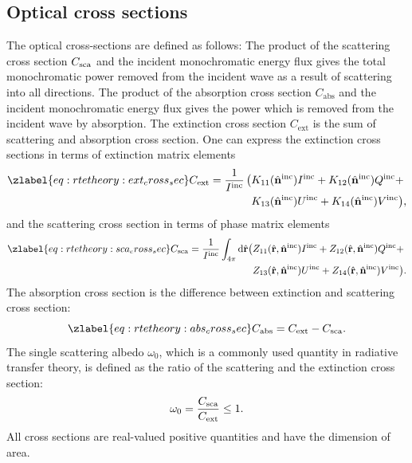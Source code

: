 \subsection{Optical cross sections}

The optical cross-sections are defined as follows: The product of the
scattering cross section $C_{\mathrm{sca}}$ and the incident monochromatic
energy flux gives the total monochromatic power removed from the
incident wave as a result of scattering into all directions. The
product of the absorption cross section $C_{\mathrm{abs}}$ and the incident
monochromatic energy flux gives the power which is removed from the
incident wave by absorption. The extinction cross section $C_{\mathrm{ext}}$ is
the sum of scattering and absorption cross section.  One can express
the extinction cross sections in terms of extinction matrix elements
\begin{eqnarray}\zlabel{eq:rtetheory:ext_cross_sec}
    C_{\mathrm{ext}} =
      \frac{1}{I^{\inc}} \, \bigl( &
                K_{11}(\hat{\VctStl{n}}^{\inc})I^{\inc}
             +  K_{12}(\hat{\VctStl{n}}^{\inc})Q^{\inc} + \\
         &      K_{13}(\hat{\VctStl{n}}^{\inc})U^{\inc}
             +  K_{14}(\hat{\VctStl{n}}^{\inc})V^{\inc} \bigr),  
\end{eqnarray}
and the scattering cross section in terms of phase matrix elements
\begin{eqnarray}\zlabel{eq:rtetheory:sca_cross_sec}
  C_{\sca} =
      \frac{1}{I^{\inc}} \int_{4\pi} \DiffD\hat{\VctStl{r}}
    \bigl(&
          Z_{11}(\hat{\VctStl{r}}, \hat{\VctStl{n}}^{\inc})I^{\inc}
        + Z_{12}(\hat{\VctStl{r}}, \hat{\VctStl{n}}^{\inc})Q^{\inc} + \\
     &    Z_{13}(\hat{\VctStl{r}}, \hat{\VctStl{n}}^{\inc})U^{\inc} +
              Z_{14}({\hat{\VctStl{r}}, \hat{\VctStl{n}}^{\inc}})V^{\inc} \bigr).
\end{eqnarray}
The absorption cross section is the difference between extinction and
scattering cross section:
\begin{equation}
  \zlabel{eq:rtetheory:abs_cross_sec}
  C_{\mathrm{abs}} = C_{\mathrm{ext}} - C_{\sca}. 
\end{equation}
The single scattering albedo $\omega_0$, which is a commonly used
quantity in radiative transfer theory, is defined as the ratio of the
scattering and the extinction cross section:
\begin{equation}
  \omega_0 = \frac{C_{\mathrm{sca}}}{C_{\mathrm{ext}}} \le 1.
\end{equation}
All cross sections are real-valued positive quantities and have the
dimension of area.

